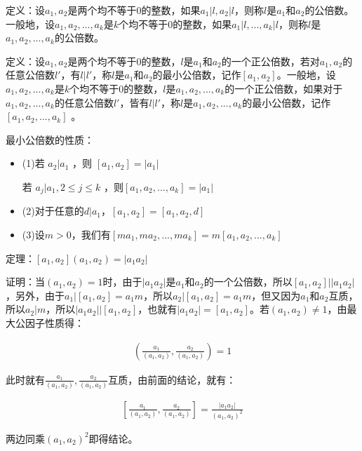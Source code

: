 \documentclass[12pt, a4paper, oneside]{ctexart}
\begin{document}
定义：设$a_1,a_2$是两个均不等于0的整数，如果$a_1|l,a_2|l$，则称$l$是$a_1$和$a_2$的公倍数。一般地，设$a_1,a_2,...,a_k$是$k$个均不等于0的整数，如果$a_1|l,...,a_k|l$，则称$l$是$a_1,a_2,...,a_k$的公倍数。

定义：设$a_1,a_2$是两个均不等于0的整数，$l$是$a_1$和$a_2$的一个正公倍数，若对$a_1,a_2$的任意公倍数$l'$，有$l|l'$，称$l$是$a_1$和$a_2$的最小公倍数，记作$[a_1,a_2]$。一般地，设$a_1,a_2,...,a_k$是$k$个均不等于0的整数，$l$是$a_1,a_2,...,a_k$的一个正公倍数，如果对于$a_1,a_2,...,a_k$的任意公倍数$l'$，皆有$l|l'$，称$l$是$a_1,a_2,...,a_k$的最小公倍数，记作$[a_1,a_2,...,a_k]$ 。

最小公倍数的性质：
\begin{itemize}
\item (1)若 $a_2|a_1$ ，则 $[a_1,a_2]=|a_1|$ 

若 $a_j|a_1,2\leqslant j\leqslant k$ ，则$[a_1,a_2,...,a_k]=|a_1|$
\item (2)对于任意的$d|a_1$，$[a_1,a_2]=[a_1,a_2,d]$
\item (3)设$m>0$，我们有$[ma_1,ma_2,...,ma_k]=m[a_1,a_2,...,a_k]$  
\end{itemize}
定理：$[a_1,a_2](a_1,a_2)=|a_1a_2|$

证明：当$(a_1,a_2)=1$时，由于$|a_1a_2|$是$a_1$和$a_2$的一个公倍数，所以$[a_1,a_2]||a_1a_2|$，另外，由于$a_1|[a_1,a_2]=a_1m$，所以$a_2|[a_1,a_2]=a_1m$，但又因为$a_1$和$a_2$互质，所以$a_2|m$，所以$|a_1a_2||[a_1,a_2]$，也就有$|a_1a_2|=[a_1,a_2]$。若$(a_1,a_2)\neq1$，由最大公因子性质得：

$$\begin{align*}
(\frac{a_1}{(a_1,a_2)},\frac{a_2}{(a_1,a_2)})=1
\end{align*}$$

此时就有$\frac{a_1}{(a_1,a_2)},\frac{a_2}{(a_1,a_2)}$互质，由前面的结论，就有：

$$\begin{align*}
[\frac{a_1}{(a_1,a_2)},\frac{a_2}{(a_1,a_2)}]=\frac{|a_1a_2|}{(a_1,a_2)^2}
\end{align*}$$

两边同乘$(a_1,a_2)^2$即得结论。
\end{document}
